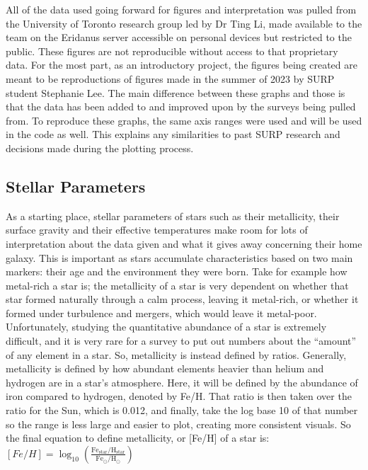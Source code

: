 \documentclass{article}
\begin{document}
\indent All of the data used going forward for figures and interpretation was pulled from the University of Toronto research group led by Dr Ting Li, made available to the team on the Eridanus server accessible on personal devices but restricted to the public. These figures are not reproducible without access to that proprietary data. For the most part, as an introductory project, the figures being created are meant to be reproductions of figures made in the summer of 2023 by SURP student Stephanie Lee. The main difference between these graphs and those is that the data has been added to and improved upon by the surveys being pulled from. To reproduce these graphs, the same axis ranges were used and will be used in the code as well. This explains any similarities to past SURP research and decisions made during the plotting process.\\

\subsection*{Stellar Parameters}
\indent As a starting place, stellar parameters of stars such as their metallicity, their surface gravity and their effective temperatures make room for lots of interpretation about the data given and what it gives away concerning their home galaxy. This is important as stars accumulate characteristics based on two main markers: their age and the environment they were born. Take for example how metal-rich a star is; the metallicity of a star is very dependent on whether that star formed naturally through a calm process, leaving it metal-rich, or whether it formed under turbulence and mergers, which would leave it metal-poor. Unfortunately, studying the quantitative abundance of a star is extremely difficult, and it is very rare for a survey to put out numbers about the “amount” of any element in a star. So, metallicity is instead defined by ratios. Generally, metallicity is defined by how abundant elements heavier than helium and hydrogen are in a star's atmosphere. Here, it will be defined by the abundance of iron compared to hydrogen, denoted by Fe/H. That ratio is then taken over the ratio for the Sun, which is 0.012, and finally, take the log base 10 of that number so the range is less large and easier to plot, creating more consistent visuals. So the final equation to define metallicity, or [Fe/H] of a star is:\\

$[Fe/H] = \log_{10} \left( \frac{{\text{Fe}_{\text{star}} / \text{H}_{\text{star}}}}{{\text{Fe}_{\odot} / \text{H}_{\odot}}} \right)
$\\
\end{document}
